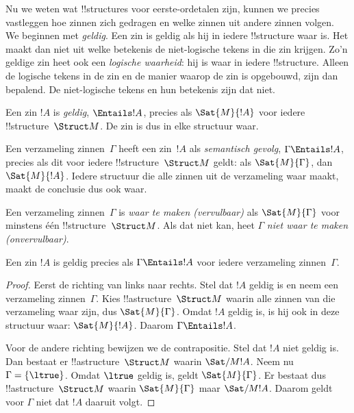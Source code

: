 \documentclass[openany]{memoir}
\begin{document}
\begin{explain}
Nu we weten wat !!{structure}s voor eerste-ordetalen zijn, kunnen we
precies vastleggen hoe zinnen zich gedragen en welke zinnen uit andere
zinnen volgen. We beginnen met \emph{geldig}. Een zin is geldig als
hij in iedere !!{structure} waar is. Het maakt dan niet uit welke
betekenis de niet-logische tekens in die zin krijgen. Zo'n geldige zin
heet ook een \emph{logische waarheid}: hij is waar in iedere
!!{structure}. Alleen de logische tekens in de zin en de manier waarop
de zin is opgebouwd, zijn dan bepalend. De niet-logische tekens en hun
betekenis zijn dat niet.
\end{explain}

\begin{defn}
Een zin $!A$ is \emph{geldig}, $\Entails !A$, precies als
$\Sat{M}{!A}$ voor iedere !!{structure}~$\Struct M$. De zin is dus in
elke structuur waar.
\end{defn}

\begin{defn}
Een verzameling zinnen~$\Gamma$ heeft een zin~$!A$ als
\emph{semantisch gevolg}, $\Gamma \Entails !A$, precies als dit voor
iedere !!{structure}~$\Struct M$ geldt: als $\Sat{M}{\Gamma}$, dan
$\Sat{M}{!A}$. Iedere structuur die alle zinnen uit de verzameling
waar maakt, maakt de conclusie dus ook waar.
\end{defn}


\begin{defn}
Een verzameling zinnen~$\Gamma$ is \emph{waar te maken
(vervulbaar)} als $\Sat{M}{\Gamma}$ voor minstens één
!!{structure}~$\Struct M$. Als dat niet kan, heet $\Gamma$
\emph{niet waar te maken (onvervulbaar)}.
\end{defn}

\begin{prop}
Een zin $!A$ is geldig precies als $\Gamma \Entails !A$ voor iedere
verzameling zinnen~$\Gamma$.
\end{prop}

\begin{proof}
Eerst de richting van links naar rechts. Stel dat $!A$ geldig is en
neem een verzameling zinnen~$\Gamma$. Kies !!a{structure}~$\Struct M$
waarin alle zinnen van die verzameling waar zijn, dus
$\Sat{M}{\Gamma}$. Omdat $!A$ geldig is, is hij ook in deze structuur
waar: $\Sat{M}{!A}$. Daarom $\Gamma \Entails !A$.

Voor de andere richting bewijzen we de contrapositie. Stel dat $!A$
niet geldig is. Dan bestaat er !!a{structure}~$\Struct M$ waarin
$\Sat/{M}{!A}$. Neem nu $\Gamma = \{ \ltrue \}$. Omdat $\ltrue$
geldig is, geldt $\Sat{M}{\Gamma}$. Er bestaat dus
!!a{structure}~$\Struct M$ waarin $\Sat{M}{\Gamma}$ maar
$\Sat/{M}{!A}$. Daarom geldt voor $\Gamma$ niet dat $!A$ daaruit
volgt.
\end{proof}
\end{document}
